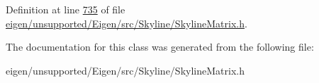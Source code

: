 Definition at line \hyperlink{eigen_2unsupported_2_eigen_2src_2_skyline_2_skyline_matrix_8h_source_l00735}{735} of file \hyperlink{eigen_2unsupported_2_eigen_2src_2_skyline_2_skyline_matrix_8h_source}{eigen/unsupported/\+Eigen/src/\+Skyline/\+Skyline\+Matrix.\+h}.



The documentation for this class was generated from the following file\+:\begin{DoxyCompactItemize}
\item 
eigen/unsupported/\+Eigen/src/\+Skyline/\+Skyline\+Matrix.\+h\end{DoxyCompactItemize}
